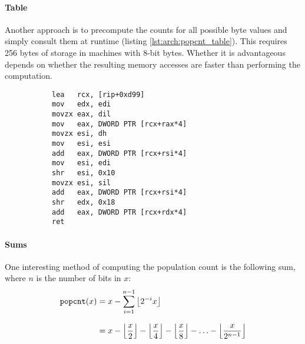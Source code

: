 \paragraph{Table}

Another approach is to precompute the counts for all possible byte values and
simply consult them at runtime (listing \ref{lst:arch:popcnt_table}).  This
requires 256 bytes of storage in machines with 8-bit bytes.  Whether it is
advantageous depends on whether the resulting memory accesses are faster than
performing the computation.

\begin{figure}[ht]
    \centering
    \vspace{-\baselineskip}
    \begin{subfigure}[t]{0.55\textwidth}
        
    \end{subfigure}
    \hspace*{\fill}
    \begin{subfigure}[t]{0.4\textwidth}
        \begin{lstlisting}[style=x86]
lea   rcx, [rip+0xd99]
mov   edx, edi
movzx eax, dil
mov   eax, DWORD PTR [rcx+rax*4]
movzx esi, dh
mov   esi, esi
add   eax, DWORD PTR [rcx+rsi*4]
mov   esi, edi
shr   esi, 0x10
movzx esi, sil
add   eax, DWORD PTR [rcx+rsi*4]
shr   edx, 0x18
add   eax, DWORD PTR [rcx+rdx*4]
ret
        \end{lstlisting}
    \end{subfigure}
    \vspace{-2\baselineskip}
\end{figure}

\paragraph{Sums}

One interesting method of computing the population count is the following sum,
where $n$ is the number of bits in $x$:
\begin{align*}
    \texttt{popcnt}(x)
        &= x - \sum_{i=1}^{n-1} \left\lfloor 2^{-i}x \right\rfloor
        \\[0.5\baselineskip]
        &= x
            - \left\lfloor \frac{x}{2}       \right\rfloor
            - \left\lfloor \frac{x}{4}       \right\rfloor
            - \left\lfloor \frac{x}{8}       \right\rfloor
            - \ldots
            - \left\lfloor \frac{x}{2^{n-1}} \right\rfloor
\end{align*}


